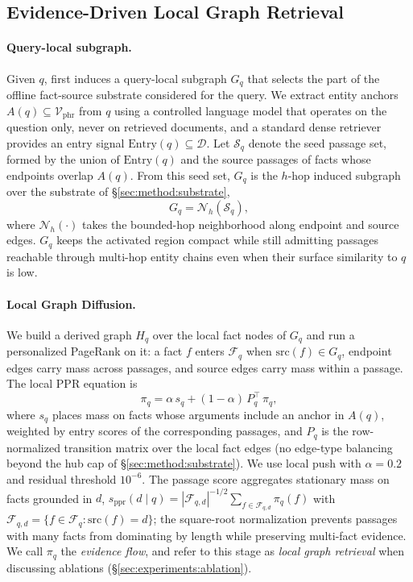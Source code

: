 \subsection{Evidence-Driven Local Graph Retrieval}
\label{sec:method:retrieval}

\paragraph{Query-local subgraph.}
Given $q$, \methodname{} first induces a query-local subgraph $G_q$
that selects the part of the offline fact-source substrate
considered for the query. We extract entity anchors
$A(q) \subseteq \mathcal{V}_{\mathrm{phr}}$ from $q$ using a
controlled language model that operates on the question only,
never on retrieved documents, and a standard dense retriever
provides an entry signal $\mathrm{Entry}(q) \subseteq \mathcal{D}$.
Let $\mathcal{S}_q$ denote the seed passage set, formed by the
union of $\mathrm{Entry}(q)$ and the source passages of facts whose
endpoints overlap $A(q)$. From this seed set, $G_q$ is the
$h$-hop induced subgraph over the substrate of
\S\ref{sec:method:substrate},
\begin{equation}
\label{eq:gq-induced}
G_q = \mathcal{N}_{h}\!\left(\mathcal{S}_q\right),
\end{equation}
where $\mathcal{N}_{h}(\cdot)$ takes the bounded-hop neighborhood
along endpoint and source edges. $G_q$ keeps the activated region
compact while still admitting passages reachable through multi-hop
entity chains even when their surface similarity to $q$ is low.

\paragraph{Local Graph Diffusion.}
We build a derived graph $H_q$ over the local fact nodes of $G_q$
and run a personalized PageRank on it: a fact $f$ enters
$\mathcal{F}_q$ when $\mathrm{src}(f)\in G_q$, endpoint edges carry
mass across passages, and source edges carry mass within a passage.
The local PPR equation is
\begin{equation}
\label{eq:local-ppr}
\pi_q = \alpha\, s_q + (1-\alpha)\, P_q^{\!\top}\, \pi_q,
\end{equation}
where $s_q$ places mass on facts whose arguments include an anchor
in $A(q)$, weighted by entry scores of the corresponding passages,
and $P_q$ is the row-normalized transition matrix over the local
fact edges (no edge-type balancing beyond the hub cap of
\S\ref{sec:method:substrate}). We use local push with $\alpha=0.2$
and residual threshold $10^{-6}$. The passage score aggregates
stationary mass on facts grounded in $d$,
$s_{\mathrm{ppr}}(d\mid q)=|\mathcal{F}_{q,d}|^{-1/2}\sum_{f\in\mathcal{F}_{q,d}}\pi_q(f)$
with $\mathcal{F}_{q,d}=\{f\in\mathcal{F}_q:\mathrm{src}(f)=d\}$;
the square-root normalization prevents passages with many facts
from dominating by length while preserving multi-fact evidence.
We call $\pi_q$ the \emph{evidence flow}, and refer to this stage
as \emph{local graph retrieval} when discussing ablations
(\S\ref{sec:experiments:ablation}).


